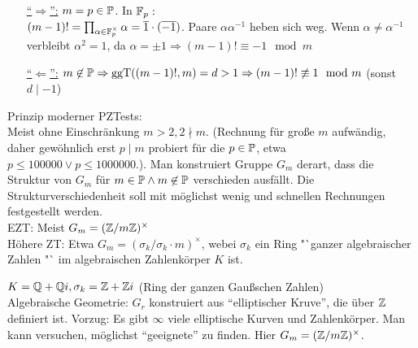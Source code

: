 \documentclass[a4paper,twoside,DIV15,BCOR12mm]{scrbook}
\begin{document}
\begin{beweis}
 \begin{itemize}
  \item[\underline{"`$\Rightarrow$"':}] $m = p \in \mathbb{P}$. In $\mathbb{F}_p:$\\
   $(m-1)! = \prod_{\alpha \in \mathbb{F}_p^\times}\alpha = \overline 1 \cdot (\overline{-1})$. Paare $\alpha\alpha^{-1}$ heben sich weg. Wenn $\alpha \not= \alpha^{-1}$ verbleibt $\alpha^2 = 1$, da $\alpha = \pm 1 \Rightarrow (m-1)! \equiv -1 \mod m$
  \item[\underline{"`$\Leftarrow$"':}] $m \not\in \mathbb{P} \Rightarrow \mathop{\rm ggT}\nolimits ((m-1)!, m) = d > 1 \Rightarrow (m-1)! \not\equiv 1 \mod m$ (sonst $d \mid -1$)
 \end{itemize}
\end{beweis}

Prinzip moderner PZTests:\\
Meist ohne Einschränkung $m > 2, 2 \nmid m$. (Rechnung für große $m$ aufwändig, daher gewöhnlich erst $p \mid m$ probiert für die $p \in \mathbb{P}$, etwa $p \le 100000 \vee p \le 1000000$.). Man konstruiert Gruppe $G_m$ derart, dass die Struktur von $G_m$ für $m \in \mathbb{P} \wedge m \not\in \mathbb{P}$ verschieden ausfällt. Die Strukturverschiedenheit soll mit möglichst wenig und schnellen Rechnungen festgestellt werden.\\
EZT: Meist $G_m  = (\mathbb{Z} / m\mathbb{Z})^\times$\\
Höhere ZT: Etwa $G_m = (\sigma_k / \sigma_k \cdot m)^\times$, webei $\sigma_k$ ein Ring "`ganzer algebraischer Zahlen "` im algebraischen Zahlenkörper $K$ ist.
\begin{beispiel}
 $K = \mathbb{Q} + \mathbb{Q} i, \sigma_k = \mathbb{Z} + \mathbb{Z} i$ (Ring der ganzen Gaußschen Zahlen)\\
 Algebraische Geometrie: $G_r$ konstruiert aus "`elliptischer Kruve"', die über $\mathbb{Z}$ definiert ist. Vorzug: Es gibt $\infty$ viele elliptische Kurven und Zahlenkörper. Man kann versuchen, möglichst "`geeignete"' zu finden. Hier $G_m = (\mathbb{Z} / m \mathbb{Z})^\times$.
\end{beispiel}
\end{document}
